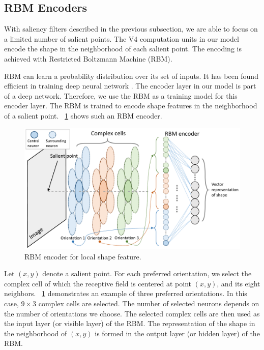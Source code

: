 \documentclass[conference]{IEEEtran}
\begin{document}
\subsection{RBM Encoders}

With saliency filters described in the previous subsection,
we are able to focus on a limited number of salient points.
The V4 computation units in our model encode the shape in the neighborhood of each salient point.
The encoding is achieved with Restricted Boltzmann Machine (RBM).

RBM can learn a probability distribution over its set of inputs.
It has been found efficient in training deep neural network \cite{hinton2006}.
The encoder layer in our model is part of a deep network.
Therefore, we use the RBM as a training model for this encoder layer.
The RBM is trained to encode shape features in the neighborhood of a salient point.
\figurename~\ref{fig:6} shows such an RBM encoder.

\begin{figure}[htp]
\centerline{\includegraphics[width=0.99\linewidth]{images/fig6.pdf}} 
\caption{RBM encoder for local shape feature.}
\label{fig:6}
\end{figure}

Let $(x,y)$ denote a salient point.
For each preferred orientation, 
we select the complex cell of which the receptive field is centered at point $(x,y)$,
and its eight neighbors.
\figurename~\ref{fig:6} demonstrates an example of three preferred orientations.
In this case, $9\times3$ complex cells are selected.
The number of selected neurons depends on the number of orientations we choose.
The selected complex cells are then used as the input layer (or visible layer) of the RBM.
The representation of the shape in the neighborhood of $(x,y)$
is formed in the output layer (or hidden layer) of the RBM.
\end{document}
